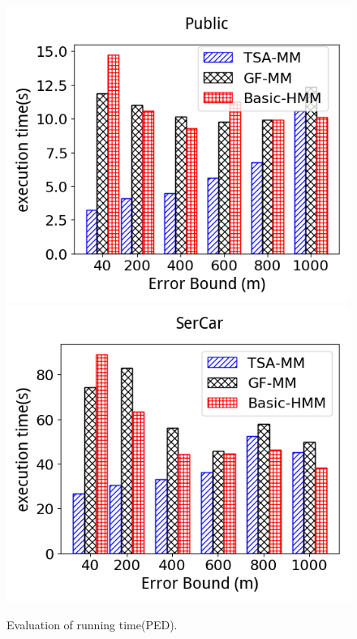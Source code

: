 \begin{figure}[tb!]
	\centering
  \includegraphics[scale=0.3]{Figures/Exp-epsilon-time-SIPED-Public.png}
  \includegraphics[scale=0.3]{Figures/Exp-epsilon-time-SIPED-SerCar.png}
	\vspace{-2ex}
  \caption{\small Evaluation of running time(PED).}
	\label{fig:rmf-epsilon-time-ped}
	\vspace{-3ex}
\end{figure}

